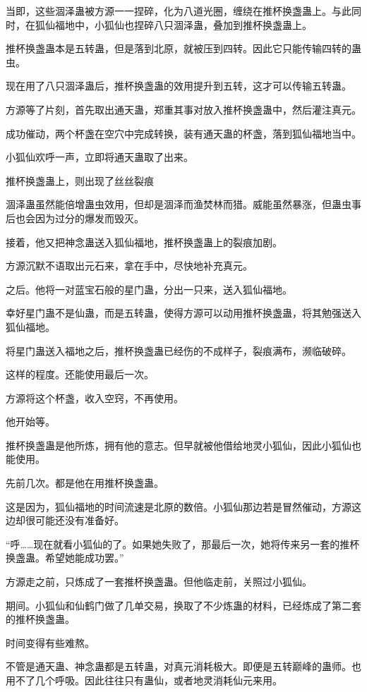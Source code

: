 \begin{this_body}
当即，这些涸泽蛊被方源一一捏碎，化为八道光圈，缠绕在推杯换盏蛊上。与此同时，在狐仙福地中，小狐仙也捏碎八只涸泽蛊，叠加到推杯换盏蛊上。

推杯换盏蛊本是五转蛊，但是落到北原，就被压到四转。因此它只能传输四转的蛊虫。

现在用了八只涸泽蛊后，推杯换盏蛊的效用提升到五转，这才可以传输五转蛊。

方源等了片刻，首先取出通天蛊，郑重其事对放入推杯换盏蛊中，然后灌注真元。

成功催动，两个杯盏在空穴中完成转换，装有通天蛊的杯盏，落到狐仙福地当中。

小狐仙欢呼一声，立即将通天蛊取了出来。

推杯换盏蛊上，则出现了丝丝裂痕

涸泽蛊虽然能倍增蛊虫效用，但却是涸泽而渔焚林而猎。威能虽然暴涨，但蛊虫事后也会因为过分的爆发而毁灭。

接着，他又把神念蛊送入狐仙福地，推杯换盏蛊上的裂痕加剧。

方源沉默不语取出元石来，拿在手中，尽快地补充真元。

之后。他将一对蓝宝石般的星门蛊，分出一只来，送入狐仙福地。

幸好星门蛊不是仙蛊，而是五转蛊，使得方源可以动用推杯换盏蛊，将其勉强送入狐仙福地。

将星门蛊送入福地之后，推杯换盏蛊已经伤的不成样子，裂痕满布，濒临破碎。

这样的程度。还能使用最后一次。

方源将这个杯盏，收入空窍，不再使用。

他开始等。

推杯换盏蛊是他所炼，拥有他的意志。但早就被他借给地灵小狐仙，因此小狐仙也能使用。

先前几次。都是他在用推杯换盏蛊。

这是因为，狐仙福地的时间流速是北原的数倍。小狐仙那边若是冒然催动，方源这边却很可能还没有准备好。

“呼……现在就看小狐仙的了。如果她失败了，那最后一次，她将传来另一套的推杯换盏蛊。希望她能成功罢。”

方源走之前，只炼成了一套推杯换盏蛊。但他临走前，关照过小狐仙。

期间。小狐仙和仙鹤门做了几单交易，换取了不少炼蛊的材料，已经炼成了第二套的推杯换盏蛊。

时间变得有些难熬。

不管是通天蛊、神念蛊都是五转蛊，对真元消耗极大。即便是五转巅峰的蛊师。也用不了几个呼吸。因此往往只有蛊仙，或者地灵消耗仙元来用。


\end{this_body}
